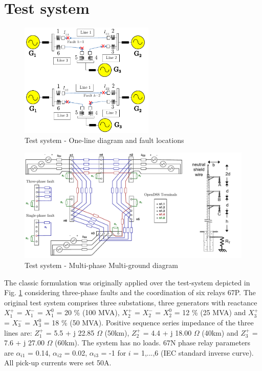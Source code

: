 \documentclass[letterpaper, 10 pt, conference]{IEEEtran}
\begin{document}
 \section{Test system}  \label{casestudy}

\begin{figure}[t!] \centerline{
     \includegraphics[width=6.4cm]{images/figure1.pdf}}
       \caption{Test system - One-line diagram and fault locations\cite{urdaneta1988}}
      \label{figure1}
        \end{figure}

                 \begin{figure}[t!] \centerline{
     \includegraphics[width=12.0cm]{images/figure2.pdf}}
       \caption{Test system - Multi-phase Multi-ground diagram}
      \label{figure2}
        \end{figure}



The classic formulation was originally applied over the test-system depicted in Fig. \ref{figure1} considering three-phase faults and the coordination of six relays 67P.
The original test system comprises three substations, three generators with reactance $X^+_1$ = $X^-_1$ = $X^0_1$ = 20  \% (100 MVA), $X^+_2$ = $X^-_2$ = $X^0_2$ = 12 \% (25 MVA) and $X^+_3$ = $X^-_3$ = $X^0_3$ = 18 \% (50 MVA). Positive sequence series impedance of the three lines are:
 $Z^+_1$ = 5.5 + j 22.85 $\Omega$ (50km), $Z^+_2$ = 4.4 + j 18.00 $\Omega$ (40km) and $Z^+_3$ = 7.6 + j 27.00 $\Omega$ (60km). The system has no loads.
  67N phase relay parameters are $\alpha_{i1}$ = 0.14, $\alpha_{i2}$ = 0.02, $\alpha_{i3}$ = -1 for $i$ = 1,...,6 (IEC standard inverse curve). All pick-up currents were set 50A.
\end{document}
